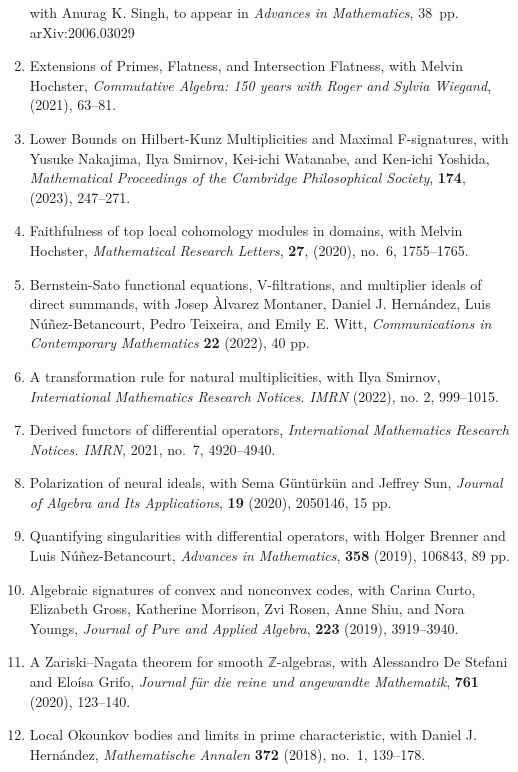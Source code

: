 \documentclass[12pt]{amsart}
\newcommand{\N}{}
\begin{document}
\begin{enumerate}[leftmargin=9mm]
with Anurag K. Singh,
to appear in \emph{Advances in Mathematics}, 38~pp. arXiv:2006.03029
\item Extensions of Primes, Flatness, and Intersection Flatness, with Melvin Hochster, \emph{Commutative Algebra: 150 years with Roger and Sylvia Wiegand}, (2021), 63--81. \N
\item Lower Bounds on Hilbert-Kunz Multiplicities and Maximal F-signatures, 
with Yusuke Nakajima, Ilya Smirnov, Kei-ichi Watanabe, and Ken-ichi Yoshida, 
\emph{Mathematical Proceedings of the Cambridge Philosophical Society},  \textbf{174}, (2023), 247--271.
\item Faithfulness of top local cohomology modules in domains,
with Melvin Hochster, \emph{Mathematical Research Letters}, \textbf{27}, (2020), no.~6, 1755--1765.  \N
\item Bernstein-Sato functional equations, V-filtrations, and multiplier ideals of direct summands,
with Josep \`Alvarez Montaner, Daniel J. Hernández, Luis N\'u\~nez-Betancourt, Pedro Teixeira, and Emily E. Witt,
\emph{Communications in Contemporary Mathematics} \textbf{22} (2022), 40 pp.  \N
\item A transformation rule for natural multiplicities,
with Ilya Smirnov,  \emph{International Mathematics Research Notices. IMRN} (2022), no. 2, 999--1015.
\item Derived functors of differential operators,   \emph{International Mathematics Research Notices. IMRN}, 2021, no.~7, 4920--4940. \N
\item Polarization of neural ideals, with Sema G\"unt\"urk\"un and Jeffrey Sun, \emph{Journal of Algebra and Its Applications}, \textbf{19} (2020), 2050146, 15 pp. \N
\item Quantifying singularities with differential operators, with Holger Brenner and Luis N\'u\~nez-Betancourt, \emph{Advances in Mathematics},  \textbf{358} (2019), 106843, 89 pp. \N
\item Algebraic signatures of convex and nonconvex codes, with Carina Curto, Elizabeth Gross, Katherine Morrison, Zvi Rosen, Anne Shiu, and Nora Youngs, \emph{Journal of Pure and Applied Algebra}, \textbf{223} (2019), 3919--3940. \N
\item A Zariski--Nagata theorem for smooth $\mathbb{Z}$-algebras, with Alessandro De Stefani and Elo\'isa Grifo, \emph{Journal für die reine und angewandte Mathematik}, \textbf{761} (2020), 123--140. \N
\item Local Okounkov bodies and limits in prime characteristic, with Daniel J. Hern\'andez, \emph{Mathematische Annalen} \textbf{372} (2018), no.~1, 139--178.

\end{enumerate}
\end{document}
